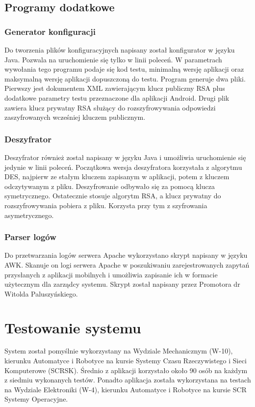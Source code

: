 \documentclass{report}
\begin{document}
		\section{Programy dodatkowe}
		
			\subsection{Generator konfiguracji}
			Do tworzenia plików konfiguracyjnych napisany został konfigurator w języku Java. Pozwala na uruchomienie się tylko w linii poleceń. W parametrach wywołania tego programu podaje się kod testu, minimalną wersję aplikacji oraz maksymalną wersję aplikacji dopuszczoną do testu. Program generuje dwa pliki. Pierwszy jest dokumentem XML zawierającym klucz publiczny RSA plus dodatkowe parametry testu przeznaczone dla aplikacji Android. Drugi plik zawiera klucz prywatny RSA służący do rozszyfrowywania odpowiedzi zaszyfrowanych wcześniej kluczem publicznym.
			
			\subsection{Deszyfrator}
			Deszyfrator również został napisany w języku Java i umożliwia uruchomienie się jedynie w linii poleceń. Początkowa wersja deszyfratora korzystała z algorytmu DES, najpierw ze stałym kluczem zapisanym w aplikacji, potem z kluczem odczytywanym z pliku. Deszyfrowanie odbywało się za pomocą klucza symetrycznego. Ostatecznie stosuje algorytm RSA, a klucz prywatny do rozszyfrowywania pobiera z pliku. Korzysta przy tym z szyfrowania asymetrycznego.
			
			\subsection{Parser logów}
			Do przetwarzania logów serwera Apache wykorzystano skrypt napisany w języku AWK. Skanuje on logi serwera Apache w poszukiwaniu zarejestrowanych zapytań przysłanych z aplikacji mobilnych i umożliwia zapisanie ich w formacie użytecznym dla zarządcy systemu. Skrypt został napisany przez Promotora dr Witolda Paluszyńskiego.
			

	\chapter{Testowanie systemu}
	
	System został pomyślnie wykorzystany na Wydziale Mechanicznym (W-10), kierunku Automatyce i Robotyce na kursie Systemy Czasu Rzeczywistego i Sieci Komputerowe (SCRSK). Średnio z aplikacji korzystało około 90 osób na każdym z siedmiu wykonanych testów. Ponadto aplikacja została wykorzystana na testach na Wydziale Elektroniki (W-4), kierunku Automatyce i Robotyce na kursie SCR Systemy Operacyjne.
\end{document}
